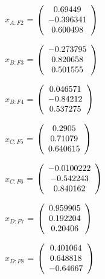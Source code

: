 \begin{description}
$\hat{x}_{A:F2}$ = $\left( \begin{array} {ccc}    0.69449 \\  -0.396341 \\   0.600498 
\end{array} \right)\\ \\$

$\hat{x}_{B:F3}$ = $\left( \begin{array} {ccc}  -0.273795 \\   0.820658 \\   0.501555 
\end{array} \right)\\ \\$

$\hat{x}_{B:F4}$ = $\left( \begin{array} {ccc}   0.046571 \\   -0.84212 \\   0.537275 
\end{array} \right)\\ \\$

$\hat{x}_{C:F5}$ = $\left( \begin{array} {ccc}     0.2905 \\    0.71079 \\   0.640615 
\end{array} \right)\\ \\$

$\hat{x}_{C:F6}$ = $\left( \begin{array} {ccc} -0.0100222 \\  -0.542243 \\   0.840162 
\end{array} \right)\\ \\$

$\hat{x}_{D:F7}$ = $\left( \begin{array} {ccc}   0.959905 \\   0.192204 \\    0.20406 
\end{array} \right)\\ \\$

$\hat{x}_{D:F8}$ = $\left( \begin{array} {ccc}   0.401064 \\   0.648818 \\   -0.64667 
\end{array} \right)\\ \\$


\end{description}
